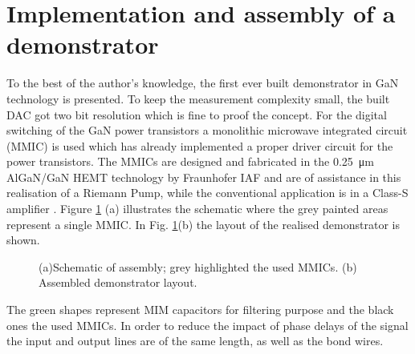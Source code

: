 \documentclass[journal]{IEEEtran}
\begin{document}
\section{Implementation and assembly of a demonstrator}
\label{sec:assembly}
To the best of the author's knowledge, the first ever built demonstrator in GaN technology is presented.
To keep the measurement complexity small, the built DAC got two bit resolution which is fine to proof the concept.
For the digital switching of the GaN power transistors a monolithic microwave integrated circuit (MMIC) is used which has already implemented a proper driver circuit for the power transistors.
The MMICs are designed and fabricated in the \SI{0.25}{\micro\meter} AlGaN/GaN HEMT technology by Fraunhofer IAF and are of assistance in this realisation of a Riemann Pump, while the conventional application is in a Class-S amplifier \cite{MaroldtDriverConcept}.
Figure \ref{fig:assembled_demonstrator} (a) illustrates the schematic where the grey painted areas represent a single MMIC.
In Fig. \ref{fig:assembled_demonstrator}(b) the layout of the realised demonstrator is shown.
%
\begin{figure}[htb]
  \centering
	\begin{scriptsize}
  	\def\svgwidth{\columnwidth}
 	 
  	\caption{(a)Schematic of assembly; grey highlighted the used MMICs. (b) Assembled demonstrator layout.}
  	\label{fig:assembled_demonstrator}
	\end{scriptsize}
\end{figure}
%
The green shapes represent MIM capacitors for filtering purpose and the black ones the used MMICs.
In order to reduce the impact of phase delays of the signal the input and output lines are of the same length, as well as the bond wires.
\end{document}
